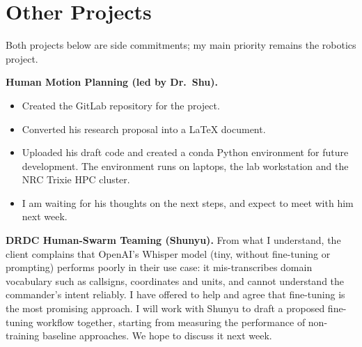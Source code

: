 \documentclass[11pt]{article}
\begin{document}
\section{Other Projects}

Both projects below are side commitments; my main priority remains the robotics project.

\medskip
\noindent\textbf{Human Motion Planning (led by Dr.~Shu).}
\begin{itemize}
    \item Created the GitLab repository for the project.
    \item Converted his research proposal into a \LaTeX{} document.
    \item Uploaded his draft code and created a conda Python environment for future development.
    The environment runs on laptops, the lab workstation and the NRC Trixie HPC cluster.
    \item I am waiting for his thoughts on the next steps, and expect to meet with him next week.
\end{itemize}

\noindent\textbf{DRDC Human-Swarm Teaming (Shunyu).}
From what I understand, the client complains that OpenAI's Whisper model (tiny, without
fine-tuning or prompting) performs poorly in their use case: it mis-transcribes domain vocabulary such as
callsigns, coordinates and units, and cannot understand the commander's intent reliably.
I have offered to help and agree that fine-tuning is the most promising approach.
I will work with Shunyu to draft a proposed fine-tuning workflow together, starting from measuring the performance of non-training baseline approaches. We hope to discuss it next week.
\end{document}
